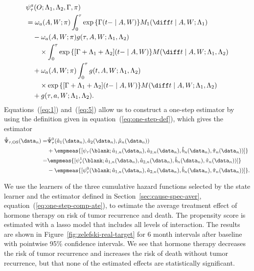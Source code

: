 \begin{equation}
  \label{eq:5}
  \begin{split}
    & \psi_{\tau}^a(O; \Lambda_1, \Lambda_2, \Gamma, \pi)
    \\
    & =
      \omega_a(A,W; \pi)
      \int_0^{\tau} \exp{\{{\Gamma(t- \mid A, W)}\}}   
      M_1(\diff t \mid A, W; \Lambda_1)
    \\
    & \quad
      -
      \omega_a(A,W; \pi)
      g(\tau, A, W; \Lambda_1, \Lambda_2)
    \\
    & \quad \quad \times
      \int_0^{\tau}
      \exp{\{{[\Gamma+\Lambda_1 + \Lambda_2](t- \mid A, W)}\}}
      M(\diff t \mid A, W; \Lambda_1, \Lambda_2)
    \\
    & \quad
      +
      \omega_a(A,W; \pi)      
      \int_0^{\tau}
      g(t, A, W; \Lambda_1, \Lambda_2)
    \\
    & \quad \quad \times
      \exp{\{{[\Gamma+\Lambda_1 + \Lambda_2](t- \mid A, W)}\}}
      M(\diff t \mid A, W; \Lambda_1, \Lambda_2)
    \\
    & \quad + g(\tau, a, W; \Lambda_1, \Lambda_2).
  \end{split}
\end{equation}
Equations~(\ref{eq:1}) and~(\ref{eq:5}) allow us to construct a one-step
estimator by using the definition given in equation~(\ref{eq:one-step-def}),
which gives the estimator
\begin{equation}
  \label{eq:one-step-comp-ate}
  \begin{split}
    \hat{\Psi}_{\tau,\text{OS}}(\data_n)
    = &
        \tilde{\Psi}_{\tau}^0(\hat{a}_1(\data_n), \hat{a}_2(\data_n),
        \hat{\mu}_n(\data_n))
    \\
      &
        +
        \empmeas{[\psi_{\tau}(\blank; \hat{a}_{1,n}(\data_n), \hat{a}_{2,n}(\data_n),
        \hat{b}_n(\data_n), \hat{\pi}_n(\data_n))]}
    \\
    = &
        \empmeas{[\psi_{\tau}^1(\blank; \hat{a}_{1,n}(\data_n), \hat{a}_{2,n}(\data_n),
        \hat{b}_n(\data_n), \hat{\pi}_n(\data_n))]}
    \\
      &
        - \empmeas{[\psi_{\tau}^0(\blank; \hat{a}_{1,n}(\data_n), \hat{a}_{2,n}(\data_n),
        \hat{b}_n(\data_n), \hat{\pi}_n(\data_n))]}.
  \end{split}
\end{equation}



We use the learners of the three cumulative hazard functions selected
by the state learner and the estimator defined in
Section~\ref{sec:cause-spec-aver},
equation~(\ref{eq:one-step-comp-ate}), to estimate the average
treatment effect of hormone therapy on risk of tumor recurrence and
death. The propensity score is estimated with a lasso model that
includes all levels of interaction.
The results are shown in Figure~\ref{fig:zelefski-real-target} for 6
month intervals after baseline with pointwise 95\% confidence
intervals. We see that hormone therapy decreases the risk of tumor
recurrence and increases the risk of death without tumor recurrence,
but that none of the estimated effects are statistically significant.


